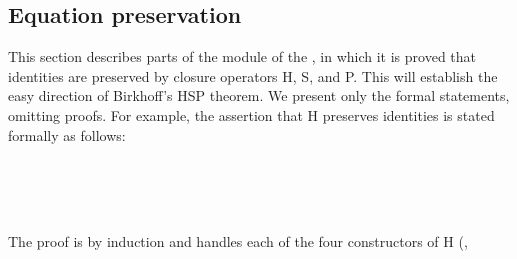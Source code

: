 \documentclass[a4paper,UKenglish,cleveref,autoref,thm-restate]{lipics-v2021}
\begin{document}
\subsection{Equation preservation}\label{equation-preservation}
This section describes parts of the \ualibPreservation module of the \agdaualib, in which it is proved that identities are preserved by closure operators \ad H, \ad S, and \ad P. This will establish the easy direction of Birkhoff's HSP theorem.  We present only the formal statements, omitting proofs. \seedocfordetails
For example, the assertion that \ad H preserves identities is stated formally as follows:
\ccpad
\begin{code}[number=code:H1]%
\>[0]\AgdaSpace{}%
\AgdaSymbol{:}%
\>[50I]\AgdaSymbol{\{}\AgdaSpace{}%
\AgdaSpace{}%
\AgdaSymbol{:}\AgdaSpace{}%
\AgdaSymbol{\}\{}\AgdaSpace{}%
\AgdaSymbol{:}\AgdaSpace{}%
\AgdaSpace{}%
\AgdaSymbol{\}\{}\AgdaSpace{}%
\AgdaSymbol{:}\AgdaSpace{}%
\AgdaSpace{}%
\AgdaSymbol{(}\AgdaSpace{}%
\AgdaSpace{}%
\AgdaSymbol{)(}\AgdaSpace{}%
\AgdaSymbol{)\}}\<%
\\
\>[.][@{}l@{}]\<[50I]%
\>[8]\AgdaSymbol{(}\AgdaSpace{}%
\AgdaSpace{}%
\AgdaSymbol{:}\AgdaSpace{}%
\AgdaSymbol{\{}\AgdaSymbol{\}\{}\AgdaSymbol{\})}\<%
\\
%
\>[8]\AgdaComment{-----------------------}\<%
\\
\>[0][@{}l@{\AgdaIndent{0}}]%
\>[1]%
\>[8]\AgdaSpace{}%
\AgdaSpace{}%
\AgdaSpace{}%
\AgdaSpace{}%
%
\>[19]%
\>[22]\AgdaSymbol{\{}\AgdaSymbol{\}\{}\AgdaSymbol{\}}\AgdaSpace{}%
\AgdaSpace{}%
\AgdaSpace{}%
\AgdaSpace{}%
\AgdaSpace{}%
\<%
\end{code}
\ccpad
\ccpad
The proof is by induction and handles each of the four constructors of \ad H (,
\end{document}
